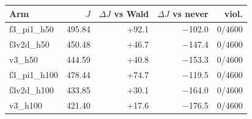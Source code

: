 \begin{tabular}{@{}l r r r r@{}}
\toprule
Arm & $J$ & $\Delta J$ vs Wald & $\Delta J$ vs never & viol. \\
\midrule
f3\_pi1\_h50 & 495.84 & +92.1 & $-$102.0 & 0/4600 \\
f3v2d\_h50 & 450.48 & +46.7 & $-$147.4 & 0/4600 \\
v3\_h50 & 444.59 & +40.8 & $-$153.3 & 0/4600 \\
f3\_pi1\_h100 & 478.44 & +74.7 & $-$119.5 & 0/4600 \\
f3v2d\_h100 & 433.85 & +30.1 & $-$164.0 & 0/4600 \\
v3\_h100 & 421.40 & +17.6 & $-$176.5 & 0/4600 \\
\bottomrule
\end{tabular}
